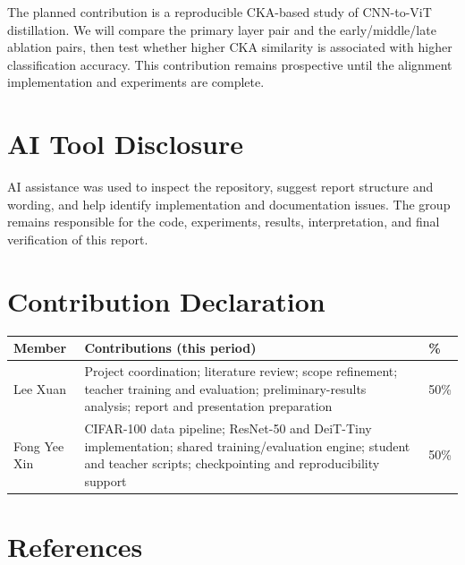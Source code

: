 \documentclass[11pt, letterpaper]{article}
\begin{document}
The planned contribution is a reproducible CKA-based study of CNN-to-ViT
distillation. We will compare the primary layer pair and the early/middle/late
ablation pairs, then test whether higher CKA similarity is associated with
higher classification accuracy. This contribution remains prospective until
the alignment implementation and experiments are complete.

\section{AI Tool Disclosure}

AI assistance was used to inspect the repository, suggest report structure and
wording, and help identify implementation and documentation issues. The group
remains responsible for the code, experiments, results, interpretation, and
final verification of this report.

\section{Contribution Declaration}

\small
\begin{tabularx}{\linewidth}{@{}p{2.3cm}Xp{0.8cm}@{}}
\toprule
\textbf{Member} & \textbf{Contributions (this period)} & \textbf{\%} \\
\midrule
Lee Xuan & Project coordination; literature review; scope refinement; teacher training and evaluation; preliminary-results analysis; report and presentation preparation & 50\% \\
Fong Yee Xin & CIFAR-100 data pipeline; ResNet-50 and DeiT-Tiny implementation; shared training/evaluation engine; student and teacher scripts; checkpointing and reproducibility support & 50\% \\
\bottomrule
\end{tabularx}

\section{References}
\end{document}
